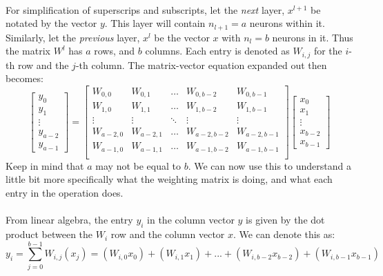 \documentclass[12pt,letterpaper]{article}
\begin{document}
\paragraph*{}For simplification of superscrips and subscripts, let the \textit{next} layer, $x^{l+1}$ be notated by the vector $y$. This layer will contain $n_{l+1} = a$ neurons within it. Similarly, let the \textit{previous} layer, $x^l$ be the vector $x$ with $n_l = b$ neurons in it. Thus the matrix $W^l$ has $a$ rows, and $b$ columns. Each entry is denoted as $W_{i,j}$ for the $i$-th row and the $j$-th column. The matrix-vector equation expanded out then becomes:
\begin{equation}
\label{mat-vec feed}
\begin{bmatrix}
y_0 \\ y_1 \\ \vdots \\ y_{a-2} \\ y_{a-1}
\end{bmatrix} =
\begin{bmatrix}
W_{0,0} & W_{0,1} & \hdots & W_{0,b-2} & W_{0,b-1} \\
W_{1,0} & W_{1,1} & \hdots & W_{1,b-2} & W_{1,b-1} \\
\vdots & \vdots & \ddots & \vdots & \vdots \\
W_{a-2,0} & W_{a-2,1} & \hdots & W_{a-2,b-2} & W_{a-2,b-1} \\
W_{a-1,0} & W_{a-1,1} & \hdots & W_{a-1,b-2} & W_{a-1,b-1} \\
\end{bmatrix}
\begin{bmatrix}
x_0 \\ x_1 \\ \vdots \\ x_{b-2} \\ x_{b-1}
\end{bmatrix}
\end{equation}
Keep in mind that $a$ may not be equal to $b$. We can now use this to understand a little bit more specifically what the weighting matrix is doing, and what each entry in the operation does.
\paragraph*{}From linear algebra, the entry $y_i$ in the column vector $y$ is given by the dot product between the $W_i$ row and the column vector $x$. We can denote this as:
\begin{equation}
\label{dot prod}
y_i = \sum_{j=0}^{b-1} W_{i,j}(x_j) = 
(W_{i,0}x_0) + (W_{i,1}x_1) +  ... + 
(W_{i,b-2}x_{b-2}) + (W_{i,b-1}x_{b-1})
\end{equation}
\end{document}
